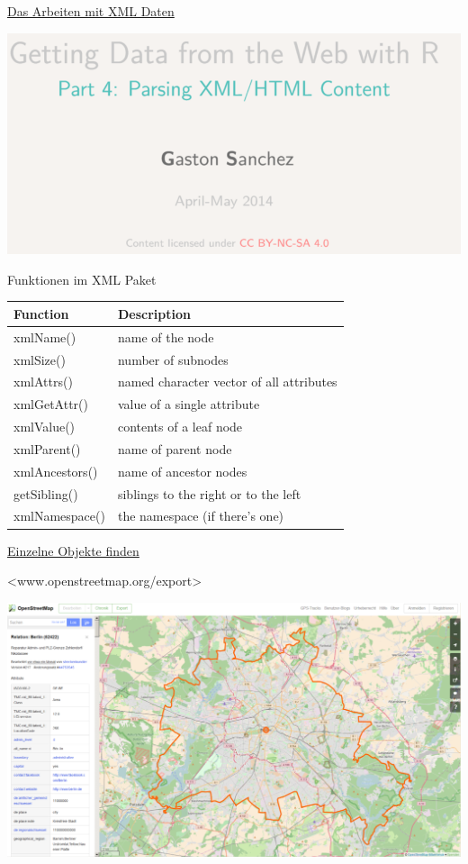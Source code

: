 \documentclass[ignorenonframetext,]{beamer}
\begin{document}
\begin{frame}{\href{https://github.com/gastonstat/tutorial-R-web-data/blob/master/04-parsing-xml/04-parsing-xml.pdf}{Das
Arbeiten mit XML Daten}}

\includegraphics{figure/GastonSanchez3.PNG}

\end{frame}

\begin{frame}{Funktionen im XML Paket}

\begin{longtable}[]{@{}ll@{}}
\toprule
Function & Description\tabularnewline
\midrule
\endhead
xmlName() & name of the node\tabularnewline
xmlSize() & number of subnodes\tabularnewline
xmlAttrs() & named character vector of all attributes\tabularnewline
xmlGetAttr() & value of a single attribute\tabularnewline
xmlValue() & contents of a leaf node\tabularnewline
xmlParent() & name of parent node\tabularnewline
xmlAncestors() & name of ancestor nodes\tabularnewline
getSibling() & siblings to the right or to the left\tabularnewline
xmlNamespace() & the namespace (if there's one)\tabularnewline
\bottomrule
\end{longtable}

\end{frame}

\begin{frame}{\href{http://www.openstreetmap.org/export}{Einzelne
Objekte finden}}

\textless{}www.openstreetmap.org/export\textgreater{}

\includegraphics{figure/admgrBer.PNG}

\end{frame}
\end{document}
